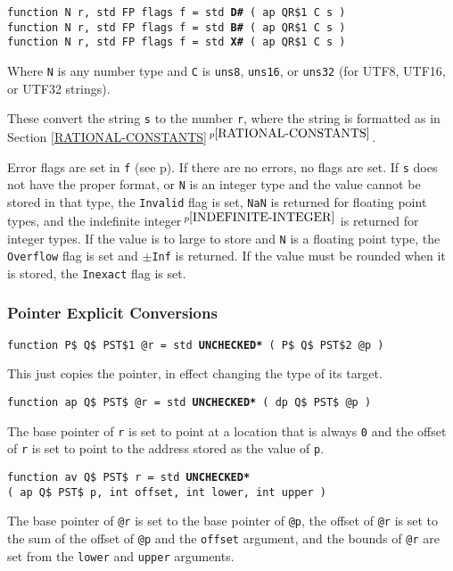 \documentclass[12pt]{article}
\newcommand{\ttkey}[1]{{\tt \bfseries #1}}
\newcommand{\itemref}[1]{\ref{#1}$\,^{p\pageref{#1}}$}
\newcommand{\pagref}[1]{p\pageref{#1}}
\newcommand{\pagnote}[1]{$\,^{p\pageref{#1}}$}
\newenvironment{indpar}[1][0.3in]%
	{\begin{list}{}%
		     {\setlength{\itemsep}{0in}%
		      \setlength{\topsep}{0in}%
		      \setlength{\parsep}{1ex}%
		      \setlength{\labelwidth}{#1}%
		      \setlength{\leftmargin}{#1}%
		      \addtolength{\leftmargin}{\labelsep}}%
	 \item}%
	{\end{list}}
\begin{document}
{\tt function N r, std FP flags f = std \ttkey{D\#} ( ap QR\$1 C s )} \\
{\tt function N r, std FP flags f = std \ttkey{B\#} ( ap QR\$1 C s )} \\
{\tt function N r, std FP flags f = std \ttkey{X\#} ( ap QR\$1 C s )}
\label{RUN-TIME-STRING-TO-NUMBER-CONVERSIONS}
\begin{indpar}
Where {\tt N} is any number type
and {\tt C} is {\tt uns8}, {\tt uns16}, or {\tt uns32} (for UTF8, UTF16,
or UTF32 strings).

These convert the string {\tt s} to the number {\tt r}, where the
string is formatted as in Section \itemref{RATIONAL-CONSTANTS}.

Error flags are set in {\tt f} (see \pagref{FP-FLAGS}).
If there are no errors, no flags are set.
If {\tt s} does not have the proper format, or {\tt N} is an integer type
and the value cannot be stored in that type,
the {\tt Invalid} flag is set, {\tt NaN} is returned for floating point types,
and the indefinite integer\pagnote{INDEFINITE-INTEGER}
is returned for integer types.
If the value is to large to store and {\tt N} is a floating point type, the
{\tt Overflow} flag is set and {\tt $\pm$Inf} is returned.
If the value must be rounded when it is stored,
the {\tt Inexact} flag is set.
\end{indpar}

\subsubsection{Pointer Explicit Conversions}

{\tt function P\$ Q\$ PST\$1 @r = std \ttkey{*UNCHECKED*} ( P\$ Q\$ PST\$2 @p )}
\begin{indpar}
This just copies the pointer, in effect changing the type of its
target.
\end{indpar}

{\tt function ap Q\$ PST\$ @r = std \ttkey{*UNCHECKED*} ( dp Q\$ PST\$ @p )}
\begin{indpar}
The base pointer of {\tt r} is set to point at a location that is
always {\tt 0} and the offset of {\tt r} is set to point to the
address stored as the value of {\tt p}.
\end{indpar}

{\tt function av Q\$ PST\$ r = std \ttkey{*UNCHECKED*} \\
\hspace*{0.2in}( ap Q\$ PST\$ p, int offset, int lower, int upper )}
\begin{indpar}
The base pointer of {\tt @r} is set to the base pointer of {\tt @p},
the offset of {\tt @r} is set to the sum of the offset of {\tt @p}
and the {\tt offset} argument, and the bounds of {\tt @r} are set from
the {\tt lower} and {\tt upper} arguments.
\end{indpar}
\end{document}
